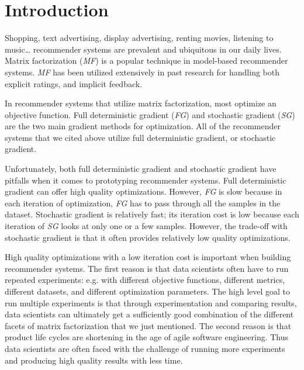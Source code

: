 \section{Introduction}
Shopping, text advertising, display advertising, renting movies, listening to music… recommender systems are prevalent and ubiquitous in our daily lives.  
Matrix factorization (\emph{MF}) is a popular technique in model-based recommender systems.  
\emph{MF} has been utilized extensively in past research for handling both explicit \cite{mmmf2005fast, mnar, gapfm} ratings, 
and implicit \cite{wrmf2008hu, wrmf2008pan, climf, bpr, mnar} feedback.  

In recommender systems that utilize matrix factorization, most optimize an objective function.  
Full deterministic gradient (\emph{FG}) and stochastic gradient (\emph{SG}) are the two main gradient methods for optimization.  
All of the recommender systems that we cited above utilize full deterministic gradient, or stochastic gradient.

Unfortunately, both full deterministic gradient and stochastic gradient have pitfalls when it comes to prototyping recommender systems.  
Full deterministic gradient can offer high quality optimizations.  
However, \emph{FG} is slow because in each iteration of optimization, \emph{FG} has to pass through all the samples in the dataset.  
Stochastic gradient is relatively fast; its iteration cost is low because each iteration of \emph{SG} looks at only one or a few samples.  
However, the trade-off with stochastic gradient is that it often provides relatively low quality optimizations.  

High quality optimizations with a low iteration cost is important when building recommender systems.  
The first reason is that data scientists often have to run repeated experiments: e.g. with different objective functions, different metrics, different datasets, and different optimization parameters.  
The high level goal to run multiple experiments is that through experimentation and comparing results, 
data scientists can ultimately get a sufficiently good combination of the different facets of matrix factorization that we just mentioned.  
The second reason is that product life cycles are shortening in the age of agile software engineering.  
Thus data scientists are often faced with the challenge of running more experiments and producing high quality results with less time.  

